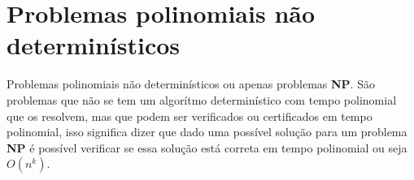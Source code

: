 \section{Problemas polinomiais não determinísticos}
Problemas polinomiais não determinísticos ou apenas problemas \textbf{NP}. 
São problemas que não se tem um algorítmo determinístico com tempo polinomial que os resolvem, mas que podem ser verificados ou certificados em tempo polinomial, isso significa dizer que dado uma possível solução para um problema \textbf{NP} é possível verificar se essa solução está correta em tempo polinomial ou seja $O(n^k)$.

